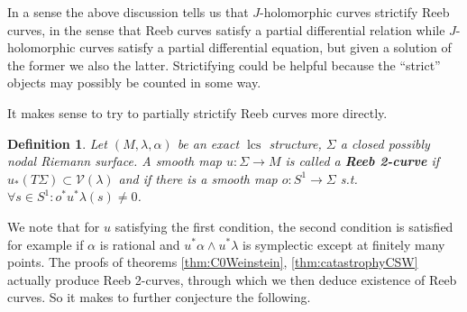 \documentclass{amsart}
\numberwithin{equation}{section}
\newtheorem{definition}[equation]{Definition}
\theoremstyle{definition}
\theoremstyle{remark}
\newtheorem{remark}[equation]{Remark}
\DeclareMathOperator{\lcs}{lcs}
\begin{document}

In a sense the above discussion tells us that $J$-holomorphic curves strictify Reeb curves, in the sense that Reeb curves satisfy a partial differential relation while $J$-holomorphic curves satisfy a partial differential equation, but given a solution of the former we also the latter. Strictifying could be helpful because the ``strict'' objects may possibly be counted in some way.  


 It makes sense to try to partially strictify Reeb curves more directly.
 \begin{definition} Let $(M,\lambda, \alpha)$ be an exact $\lcs$ structure,  $\Sigma$ a closed possibly nodal Riemann surface.  A smooth map $u: \Sigma  \to M$ is called a \textbf{\emph{Reeb 2-curve}} if $u_*(T \Sigma) \subset  \mathcal{V} (\lambda)$ and if there is a smooth map $o: S ^{1} \to \Sigma $ s.t. $\forall s \in S ^{1}: o ^{*} u ^{*} \lambda (s) \neq 0  $. 
\end{definition}
 We note that for $u$ satisfying the first condition, the second condition is satisfied for example if $\alpha$ is rational and $u ^{*} \alpha \wedge u ^{*} \lambda  $ is symplectic except at finitely many points.    %
The proofs of theorems \ref{thm:C0Weinstein}, \ref{thm:catastrophyCSW} actually produce Reeb 2-curves, through which we then deduce existence of Reeb curves. So it makes to further conjecture the following.
\end{document}
